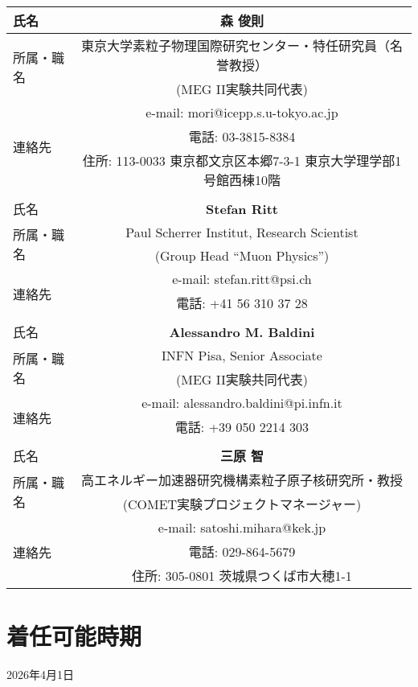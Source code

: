 \documentclass[11pt,a4paper,uplatex,dvipdfmx]{ujarticle} 		%
\newcommand{\研究課題名}{象の卵}
\newcommand{\研究機関名}{東京大学}
\newcommand{\研究代表者氏名}{内山雄祐}
\newcommand{\研究期間の最終元号年度}{6}  %
\begin{document}
\begin{table}[hbtp]
  \centering
  \begin{tabular}{lc}
    \hline
    氏名   & {\bf \Large{森 俊則}} \\
    \hline
    \multirow{2}{*}{所属・職名} & 東京大学素粒子物理国際研究センター・特任研究員（名誉教授） \\
    & (MEG II実験共同代表)\\
    \hline
    \multirow{3}{*}{連絡先} & e-mail: mori@icepp.s.u-tokyo.ac.jp \\
    & 電話: 03-3815-8384 \\
    & 住所: 113-0033 東京都文京区本郷7-3-1
東京大学理学部1号館西棟10階\\
    \hline
\\
    \hline
    氏名   & {\bf \Large{Stefan Ritt}} \\
    \hline
    \multirow{2}{*}{所属・職名} &  Paul Scherrer Institut, Research Scientist  \\
    & (Group Head ``Muon Physics'') \\
    \hline
    \multirow{3}{*}{連絡先} & e-mail: stefan.ritt@psi.ch \\
    & 電話: +41 56 310 37 28 \\
    \hline
\\
       \hline
    氏名   & {\bf \Large{Alessandro M. Baldini}} \\
    \hline
    \multirow{2}{*}{所属・職名} &  INFN Pisa, Senior Associate  \\
    & (MEG II実験共同代表) \\
    \hline
    \multirow{3}{*}{連絡先} & e-mail: alessandro.baldini@pi.infn.it \\
    & 電話: +39 050 2214 303 \\
    \hline
 \\
    \hline
    氏名   & {\bf \Large{三原 智}} \\
    \hline
    \multirow{2}{*}{所属・職名} & 高エネルギー加速器研究機構素粒子原子核研究所・教授 \\
    & (COMET実験プロジェクトマネージャー)\\
    \hline
   \multirow{3}{*}{連絡先} & e-mail: satoshi.mihara@kek.jp \\
    & 電話: 029-864-5679 \\
    & 住所: 305-0801 茨城県つくば市大穂1-1\\
    \hline
 
    \end{tabular}
\end{table}

\section{着任可能時期}
2026年4月1日

\end{document}
